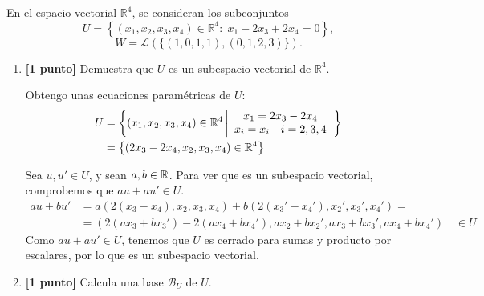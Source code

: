\documentclass[12pt]{article}
\begin{document}
    \begin{ejercicio}
    En el espacio vectorial $\mathbb{R}^4$, se consideran los subconjuntos
    $$ U = \left\{ \left( x_1, x_2, x_3, x_4\right) \in \mathbb{R}^4 :\; x_1 - 2x_3 + 2x_4 = 0 \right\}, $$
    $$ W = \mathcal{L}\left(\{(1,0,1,1),(0,1,2,3)\}\right). $$

    \begin{enumerate}
        \item \textbf{[1 punto]} Demuestra que $U$ es un subespacio vectorial de $\mathbb{R}^4$.

        Obtengo unas ecuaciones paramétricas de $U$:
        \begin{equation*}\begin{split}
            U&=\left\{(x_1, x_2, x_3, x_4)\in \mathbb{R}^4\left|\begin{array}{c}
                x_1=2x_3-2x_4 \\
                x_i=x_i \quad i=2,3,4
            \end{array}\right.\right\} \\
            &= \left\{(2x_3-2x_4,x_2,x_3, x_4)\in \mathbb{R}^4\right\}
        \end{split}\end{equation*}

        Sea $u,u'\in U$, y sean $a,b\in \mathbb{R}$. Para ver que es un subespacio vectorial, comprobemos que $au+au'\in U$.
        \begin{equation*}\begin{split}
            au+bu' &= a(2(x_3-x_4),x_2,x_3, x_4) + b(2(x_3'-x_4'),x_2',x_3', x_4')
            =\\&= \left(2(ax_3+bx_3') -2(ax_4+bx_4'), ax_2+bx_2', ax_3+bx_3', ax_4+bx_4'\right) \quad \in U
        \end{split}\end{equation*}
        Como $au+au'\in U$, tenemos que $U$ es cerrado para sumas y producto por escalares, por lo que es un subespacio vectorial.
        
        \item \textbf{[1 punto]} Calcula una base $\mathcal{B}_U$ de $U$.


\end{enumerate}
\end{ejercicio}
\end{document}
